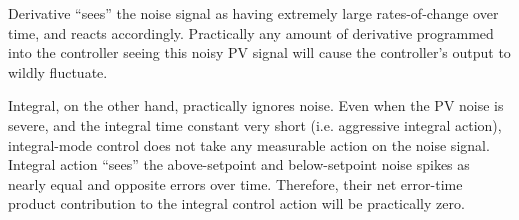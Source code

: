 












Derivative ``sees'' the noise signal as having extremely large rates-of-change over time, and reacts accordingly.  Practically any amount of derivative programmed into the controller seeing this noisy PV signal will cause the controller's output to wildly fluctuate.

\vskip 10pt

Integral, on the other hand, practically ignores noise.  Even when the PV noise is severe, and the integral time constant very short (i.e. aggressive integral action), integral-mode control does not take any measurable action on the noise signal.  Integral action ``sees'' the above-setpoint and below-setpoint noise spikes as nearly equal and opposite errors over time.  Therefore, their net error-time product contribution to the integral control action will be practically zero.




